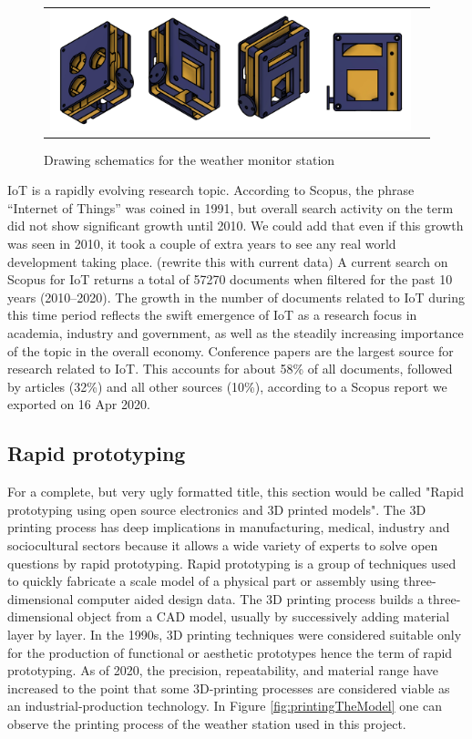 \begin{figure}[!htb]
    \centering
    \begin{tabular}{cc}
        \includegraphics[width=15.5cm]{figures/final-pro-narrow}
    \end{tabular}
    \caption{Drawing schematics for the weather monitor station}
    \label{fig:schematics}
\end{figure}

IoT is a rapidly evolving research topic. According to Scopus, the phrase “Internet of Things” was coined in 1991, but overall search activity on the term did not show significant growth until 2010. We could add that even if this growth was seen in 2010, it took a couple of extra years to see any real world development taking place. (rewrite this with current data) A current search on Scopus for IoT returns a total of 57270 documents when filtered for the past 10 years (2010–2020). The growth in the number of documents related to IoT during this time period reflects the swift emergence of IoT as a research focus in academia, industry and government, as well as the steadily increasing importance of the topic in the overall economy. Conference papers are the largest source for research related to IoT. This accounts for about 58\% of all documents, followed by articles (32\%) and all other sources (10\%), according to a Scopus report we exported on 16 Apr 2020.

\subsection{Rapid prototyping}

For a complete, but very ugly formatted title, this section would be called "Rapid prototyping using open source electronics and 3D printed models". The 3D printing process has deep implications in manufacturing, medical, industry and sociocultural sectors because it allows a wide variety of experts to solve open questions by rapid prototyping. Rapid prototyping is a group of techniques used to quickly fabricate a scale model of a physical part or assembly using three-dimensional computer aided design data. The 3D printing process builds a three-dimensional object from a CAD model, usually by successively adding material layer by layer. In the 1990s, 3D printing techniques were considered suitable only for the production of functional or aesthetic prototypes hence the term of rapid prototyping. As of 2020, the precision, repeatability, and material range have increased to the point that some 3D-printing processes are considered viable as an industrial-production technology. In Figure \ref{fig:printingTheModel} one can observe the printing process of the weather station used in this project.

